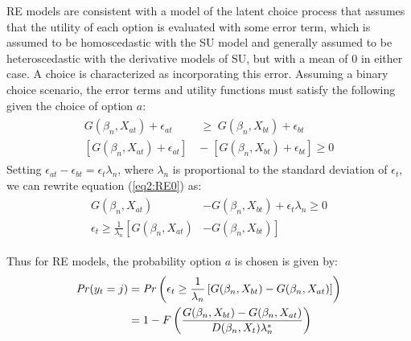 \documentclass[../main.tex]{subfiles}
\begin{document}
RE models are consistent with a model of the latent choice process that assumes that the utility of each option is evaluated with some error term, which is assumed to be homoscedastic with the SU model and generally assumed to be heteroscedastic with the derivative models of SU, but with a mean of $0$ in either case.
A choice is characterized as incorporating this error.
Assuming a binary choice scenario, the error terms and utility functions must satisfy the following given the choice of option $a$:
\begin{align}
	\label{eq2:RE0}
	\begin{split}
		G(\beta_n,X_{at}) + \epsilon_{at} \;&\geq\; G(\beta_n,X_{bt}) + \epsilon_{bt}\\
		\left[G(\beta_n,X_{at}) + \epsilon_{at}\right] \;&-\; \left[G(\beta_n,X_{bt}) + \epsilon_{bt}\right] \geq 0
	\end{split}
\end{align}
\noindent Setting $\epsilon_{at} - \epsilon_{bt} = \epsilon_t\lambda_n$, where $\lambda_n$ is proportional to the standard deviation of $\epsilon_t$,{\footnotemark} we can rewrite equation (\ref{eq2:RE0}) as:
\begin{align}
	\label{eq2:RE1}
	\begin{split}
		G(\beta_n,X_{at}) &- G(\beta_n,X_{bt}) + \epsilon_t\lambda_n \geq 0\\
		\epsilon_t \geq \frac{1}{\lambda_n} \left[ G(\beta_n,X_{at}) \right.  &- \left. G(\beta_n,X_{bt}) \right]
	\end{split}
\end{align}
\addtocounter{footnote}{-1}
\noindent Thus for RE models, the probability option $a$ is chosen is given by:
\begin{align}
	\label{eq2:RE.2}
	\begin{split}
	{\ensuremath{\mathit{Pr}}}(y_t = j) &= {\mathit{Pr}}\left(  \epsilon_t \geq \frac{1}{\lambda_n} \left[ G(\beta_n,X_{bt}) - G(\beta_n,X_{at}) \right] \right)\\
	&= 1 - F\left( \dfrac{G(\beta_n,X_{bt}) - G(\beta_n,X_{at})}{D(\beta_n,X_t)\lambda_n^* }  \right)
	\end{split}
\end{align}
\end{document}
